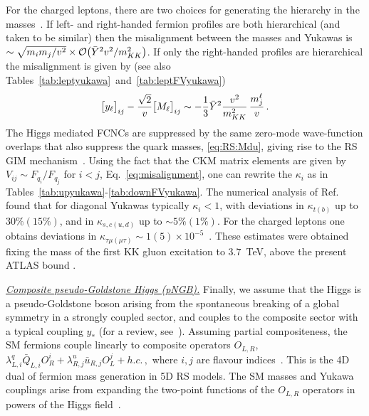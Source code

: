 \documentclass[../report.tex]{subfiles}
\begin{document}
For the charged leptons, there are two choices for generating the hierarchy in
the masses~\cite{Azatov:2009na}. If left- and right-handed fermion profiles are
both hierarchical (and taken to be similar) then the misalignment between the
masses and Yukawas is $\sim \sqrt{{m_i m_j}/{v^2}} \times \mathcal{O}\big(\bar Y^2
v^2/m_{KK}^2\big)$. If only the right-handed profiles are hierarchical the
misalignment is given by (see also
Tables~\ref{tab:leptyukawa}~and~\ref{tab:leptFVyukawa})
\begin{equation}\label{eq:lept-misalignment}
	\big[y_\ell\big]_{ij}-\frac{\sqrt2}{v}\big[M_\ell\big]_{ij}\sim -
	\frac{1}{3}\bar Y^2 \frac{v^2}{m_{KK}^2}\,\frac{m_j^\ell}{v}\,. \end{equation} The Higgs mediated FCNCs
are suppressed by the same zero-mode wave-function overlaps that also suppress
the quark masses, \eqref{eq:RS:Mdu}, giving rise to the RS GIM
mechanism~\cite{Cacciapaglia:2007fw, Agashe:2004cp, Agashe:2004ay}. Using the
fact that the CKM matrix elements are given by $V_{ij}\sim F_{q_i}/F_{q_j}$ for
$i<j$, Eq.~\eqref{eq:misalignment}, one can rewrite the $\kappa_i$ as in
Tables~\ref{tab:upyukawa}-\ref{tab:downFVyukawa}. The numerical analysis of
Ref.~\cite{Azatov:2009na} found that for diagonal Yukawas typically
$\kappa_i<1$, with deviations in $\kappa_{t(b)}$ up to $30\%(15\%)$, and in
$\kappa_{s,c (u,d)}$ up to $\sim 5\%(1\%)$.
For the charged leptons one obtains deviations in $\kappa_{\tau\mu(\mu\tau)}\sim 1(5)\times 10^{-5}$~\cite{Azatov:2009na}.
These estimates were obtained fixing the mass of the first KK gluon excitation to
$3.7$~TeV, above the present ATLAS bound \cite{ATLAS-CONF-2015-009}.

\underline{\it Composite pseudo-Goldstone Higgs (pNGB).}
Finally, we assume that the Higgs is a
pseudo-Goldstone boson arising from the spontaneous breaking of a
global symmetry in a strongly coupled sector, and  couples to the composite
sector with a typical coupling $y_*$ \cite{Dugan:1984hq,
  Georgi:1984ef, Kaplan:1983sm, Kaplan:1983fs} (for a review, see~\cite{Panico:2015jxa}).
Assuming partial compositeness, the SM fermions couple linearly to composite operators
$O_{L,R}$,
$\lambda_{L,i}^q \bar Q_{L,i} O_R^i+\lambda_{R,j}^u \bar u_{R,j}
O_L^j+h.c. \,,$
where $i,j$ are flavour indices~\cite{Kaplan:1991dc}. This is the 4D dual of fermion
mass generation in 5D RS models.  The SM masses and Yukawa
couplings arise from expanding the two-point functions of the
$O_{L,R}$ operators in powers of the Higgs field~\cite{Agashe:2009di}.
\end{document}
